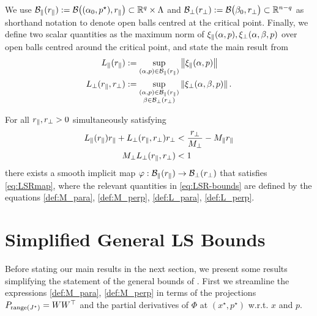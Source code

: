 \documentclass[letterpaper, 10 pt, conference]{ieeeconf}
\begin{document}
We use \(\Bpr := \mathcal{B}\big((\alpha_0,p^{\star}),\rpr\big) \subset \R[q] \times \Lambda \) and \(\Bpp := \mathcal{B}\big(\beta_0,\rpp\big) \subset \R[n-q]\) as shorthand notation to denote open balls centred at the critical point.
Finally, we define two scalar quantities as the maximum norm of \(\xipr{p}, \xipp{p}\) over open balls centred around the critical point, and state the main result from \cite{gupta2024estimates}
\begin{subequations}
    \begin{align}
        \Lpr & := \sup_{(\alpha,p) \in \Bpr} \norm{\xipr{p}} \label{def:L_para} \\
        \Lpp & := \sup_{\substack{(\alpha,p) \in \Bpr                           \\ \beta \in \Bpp}} \norm{\xipp{p}}. \label{def:L_perp}
    \end{align}
\end{subequations}

\begin{theorem}\label{thm:LSR-bounds}  \cite[Theorem 3.2]{gupta2024estimates}
    For all \(\rpr,\rpp>0\) simultaneously satisfying
    \begin{subequations}
        \begin{align}
            \Lpr\rpr + \Lpp\rpp & < \frac{\rpp}{\Mpp} - \Mpr\rpr \label{eq:LSR_1} \\
            \Mpp\Lpp            & < 1 \label{eq:LSR_2}
        \end{align} \label{eq:LSR-bounds}%
    \end{subequations}
    there exists a smooth implicit map \(\varphi : \Bpr \to \Bpp\) that satisfies \eqref{eq:LSRmap}, where the relevant quantities in \eqref{eq:LSR-bounds} are defined by the equations \eqref{def:M_para}, \eqref{def:M_perp}, \eqref{def:L_para}, \eqref{def:L_perp}.
\end{theorem}


\section{Simplified General LS Bounds}
\label{sec:simple_bounds}

Before stating our main results in the next section, we present some results simplifying the statement of the general bounds of .
First we streamline the expressions \eqref{def:M_para}, \eqref{def:M_perp} in terms of the projections \(P_{\range(J^{\star})}=WW^{\top}\) and the partial derivatives of \(\Phi\) at \((x^{\star},p^{\star})\) w.r.t. \(x\) and \(p\).
\end{document}
